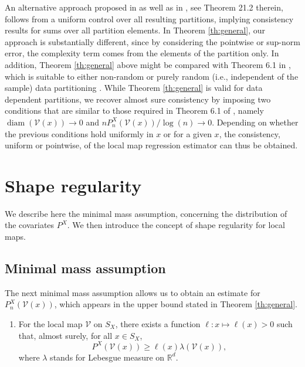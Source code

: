 \documentclass[paper=a4, fontsize=11pt]{scrartcl}
\newcommand{\diam}{\operatorname{diam}}
\begin{document}
An alternative approach proposed in \cite{lugosinobel,nobel} as well as in \cite{devroye96probabilistic}, see Theorem 21.2 therein, follows from a uniform control over all resulting partitions, implying consistency results for sums over all partition elements. In Theorem \ref{th:general}, our approach is substantially different, since by considering the pointwise or sup-norm error,  the complexity term comes from the elements of the partition only. In addition, Theorem \ref{th:general} above might be compared with Theorem 6.1 in \cite{devroye96probabilistic}, which is suitable to either non-random or purely random (i.e., independent of the sample) data partitioning \citep{JMLR:v9:biau08a}. While Theorem \ref{th:general} is valid for data dependent partitions, we recover almost sure consistency by imposing two conditions that are similar to those required in Theorem 6.1 of \cite{devroye96probabilistic}, namely $\diam  (\mathcal V(x) )  \to 0 $ and $ nP_n^X( \mathcal V(x) ) / \log(n )  \to 0$. Depending on whether the previous conditions hold uniformly in $x$ or for a given $x$, the consistency, uniform or pointwise, of the local map regression estimator can thus be obtained.


\section{Shape regularity}\label{s3}

We describe here the minimal mass assumption, concerning the distribution of the covariates $P^X$. We then introduce the concept of shape regularity for local maps.

\subsection{Minimal mass assumption}\label{4.1}

The next minimal mass assumption allows us to obtain an estimate for $P_n^X(\mathcal V(x)) $, which appears in the upper bound stated in Theorem \ref{th:general}.


\begin{enumerate}[label=(X), wide=0.5em,  leftmargin=*]
\item  \label{cond:density_X} 
For the local map $\mathcal V$ on $S_X$, there exists a function $\ell : x \mapsto \ell(x)> 0$ such that, almost surely, for all $x\in S_X$, 
$$ P^X(\mathcal V(x) )  \geq  \ell(x) \lambda (\mathcal V(x)  )  ,$$
where $\lambda$ stands for Lebesgue measure on $\mathbb R^d$.
\setcounter{nameOfYourChoice}{\value{enumi}}
\end{enumerate}
\end{document}
